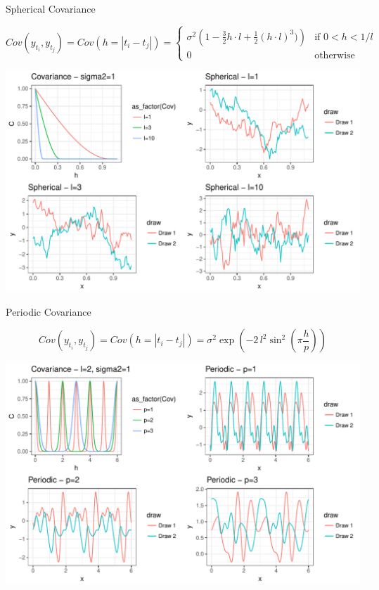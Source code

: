 \documentclass[11pt,ignorenonframetext,]{beamer}
\begin{document}
\begin{frame}[t]{Spherical Covariance}

\vspace{-5mm} \small
\[ Cov(y_{t_i}, y_{t_j}) = Cov(h = |t_i - t_j|) = \begin{cases}
\sigma^2\left(1 - \frac{3}{2} h \cdot l + \frac{1}{2} (h \cdot l)^3)\right) & \text{if   } 0 < h < 1/l \\
0 & \text{otherwise}
\end{cases}\]

\begin{center}\includegraphics{Lec14_files/figure-beamer/unnamed-chunk-13-1} \end{center}

\end{frame}

\begin{frame}[t]{Periodic Covariance}

\vspace{-5mm}
\[ Cov(y_{t_i}, y_{t_j}) = Cov(h = |t_i - t_j|) = \sigma^2 \exp\left(-2\, l^2 \sin^2\left(\pi\frac{h}{p}\right)\right) \]

\begin{center}\includegraphics{Lec14_files/figure-beamer/unnamed-chunk-14-1} \end{center}

\end{frame}
\end{document}

